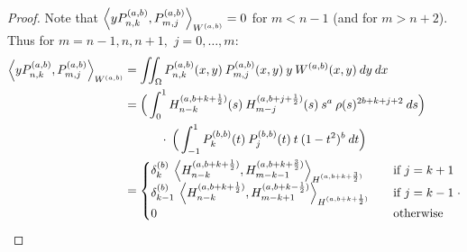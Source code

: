 \documentclass[11pt, oneside]{article}   	%
\newcommand{\half}{\frac{1}{2}}
\newcommand{\Pnkab}{P_{n,k}^{(a,b)}}
\newcommand{\Wab}{{W^{(a,b)}}}
\newcommand{\Pmjab}{P_{m,j}^{(a,b)}}
\begin{document}
\begin{proof}
Note that \(\ip<y \Pnkab, P_{m,j}^{(a,b)}>_\Wab = 0\) for \(m < n-1\) (and for \(m > n+2\)). Thus for \(m = n-1, n, n+1,\) \(j = 0,\dots,m:\)
\begin{align}
\ip<y \Pnkab, P_{m,j}^{(a,b)}>_\Wab &=  \iint_\Omega \Pnkab(x,y) \: \Pmjab(x,y) \: y \: \Wab(x,y) \: dy \: dx \\
&= \Big( \int^1_0 H_{n-k}^{(a, b+k+\half)}(s) \: H_{m-j}^{(a, b+j+\half)}(s) \: s^a \: \rho(s)^{2b+k+j+2} \: ds \Big) \nonumber \\
& \quad \quad \quad\cdot \: \Big( \int^1_{-1} P_k^{(b,b)}(t) \: P_j^{(b,b)}(t) \: t \: (1-t^2)^b \: dt \Big) \\
&= \begin{cases}
    	\delta_k^{(b)} \: \ip<H_{n-k}^{(a, b+k+\half)}, H_{m-k-1}^{(a, b+k+\frac{3}{2})}>_{H^{(a, b+k+\frac{3}{2})}} \quad& \text{if } j = k+1 \\
	\delta_{k-1}^{(b)} \: \ip<H_{n-k}^{(a, b+k+\half)}, H_{m-k+1}^{(a, b+k-\half)}>_{H^{(a, b+k+\half)}} \quad& \text{if } j = k-1 \\
	0 & \text{otherwise}
      \end{cases}.
\end{align}

\end{proof}
\end{document}
